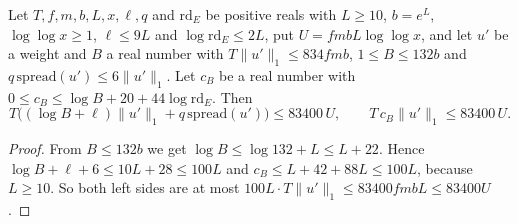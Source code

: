 \begin{lemma}\label{cov:size}
Let $T,f,m,b,L,x,\ell,q$ and $\mathrm{rd}_E$ be positive reals with $L\ge10$, $b=e^L$, $\log\log x\ge1$, $\ell\le9L$ and $\log\mathrm{rd}_E\le2L$, put $U=fmbL\log\log x$, and let $u'$ be a weight and $B$ a real number with $T\lVert u'\rVert_1\le834fmb$, $1\le B\le132b$ and $q\,\mathrm{spread}(u')\le6\lVert u'\rVert_1$. Let $c_B$ be a real number with $0\le c_B\le\log B+20+44\log\mathrm{rd}_E$. Then
\[
T\big((\log B+\ell)\lVert u'\rVert_1+q\,\mathrm{spread}(u')\big)\le83400\,U,\qquad T\,c_B\lVert u'\rVert_1\le83400\,U.
\]
\end{lemma}

\begin{proof}
From $B\le132b$ we get $\log B\le\log132+L\le L+22$. Hence $\log B+\ell+6\le10L+28\le100L$ and $c_B\le L+42+88L\le100L$, because $L\ge10$. So both left sides are at most $100L\cdot T\lVert u'\rVert_1\le83400fmbL\le83400U$.
\end{proof}

